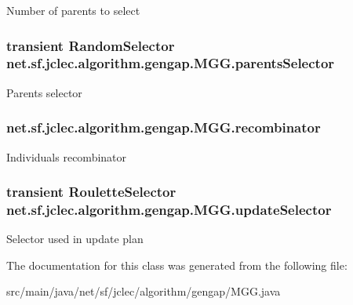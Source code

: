 Number of parents to select \hypertarget{classnet_1_1sf_1_1jclec_1_1algorithm_1_1gengap_1_1_m_g_g_a14ce69fe9d90868e0efb697097ec0bb4}{
\subsubsection[{parents\-Selector}]{\setlength{\rightskip}{0pt plus 5cm}transient {\bf Random\-Selector} net.\-sf.\-jclec.\-algorithm.\-gengap.\-M\-G\-G.\-parents\-Selector\hspace{0.3cm}{\ttfamily [protected]}}}\label{classnet_1_1sf_1_1jclec_1_1algorithm_1_1gengap_1_1_m_g_g_a14ce69fe9d90868e0efb697097ec0bb4}
Parents selector \hypertarget{classnet_1_1sf_1_1jclec_1_1algorithm_1_1gengap_1_1_m_g_g_a9766f8cca6d32372c8570b7d3c5e6a8c}{
\subsubsection[{recombinator}]{ net.\-sf.\-jclec.\-algorithm.\-gengap.\-M\-G\-G.\-recombinator\hspace{0.3cm}{\ttfamily [protected]}}}\label{classnet_1_1sf_1_1jclec_1_1algorithm_1_1gengap_1_1_m_g_g_a9766f8cca6d32372c8570b7d3c5e6a8c}
Individuals recombinator \hypertarget{classnet_1_1sf_1_1jclec_1_1algorithm_1_1gengap_1_1_m_g_g_afeff57b9f43dd10f6fe97420fa55a1a2}{
\subsubsection[{update\-Selector}]{\setlength{\rightskip}{0pt plus 5cm}transient {\bf Roulette\-Selector} net.\-sf.\-jclec.\-algorithm.\-gengap.\-M\-G\-G.\-update\-Selector\hspace{0.3cm}{\ttfamily [protected]}}}\label{classnet_1_1sf_1_1jclec_1_1algorithm_1_1gengap_1_1_m_g_g_afeff57b9f43dd10f6fe97420fa55a1a2}
Selector used in update plan 

The documentation for this class was generated from the following file\-:\begin{DoxyCompactItemize}
\item 
src/main/java/net/sf/jclec/algorithm/gengap/M\-G\-G.\-java\end{DoxyCompactItemize}
